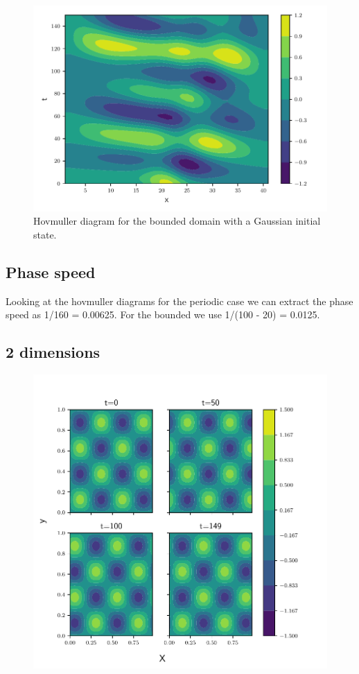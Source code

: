 \begin{figure}[htp]
  \centering
  \includegraphics[width=\textwidth]{../figures/psi_bounded_centered_gauss.pdf}
  \caption{Hovmuller diagram for the bounded domain with a Gaussian initial
  state.}
  \label{fig:bounded_gauss}
\end{figure}


\subsection{Phase speed}


Looking at the hovmuller diagrams for the periodic case we
can extract the phase speed as 1/160 = 0.00625.
For the bounded we use 1/(100 - 20) = 0.0125.


\subsection{2 dimensions}


\begin{figure}[htp]
  \centering
  \includegraphics[width=\textwidth]{../figures/periodic_2d.pdf}
  \caption{}
  \label{fig:2d_periodic}
\end{figure}


